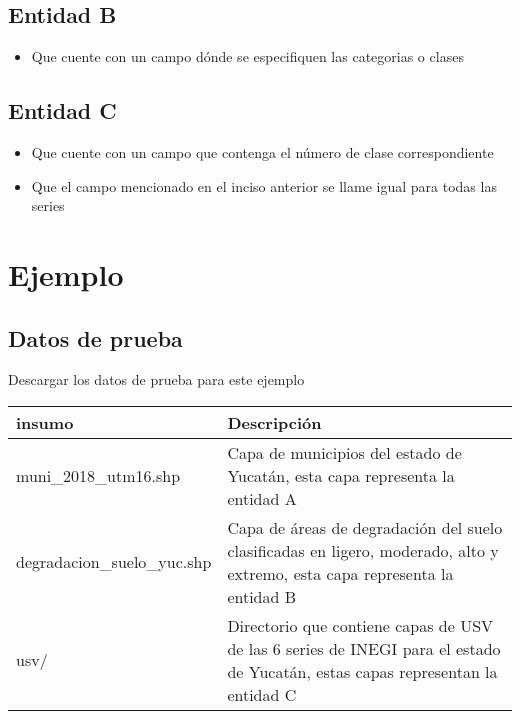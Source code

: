 \documentclass[letterpaper,10pt,spanish]{sphinxmanual}
\begin{document}
\subsection{Entidad B}
\label{\detokenize{tabulacion_3geo:entidad-b}}\begin{itemize}
\item {} 
Que cuente con un campo dónde se especifiquen las categorias o clases

\end{itemize}


\subsection{Entidad C}
\label{\detokenize{tabulacion_3geo:entidad-c}}\begin{itemize}
\item {} 
Que cuente con un campo que contenga el número de clase correspondiente

\item {} 
Que el campo mencionado en el inciso anterior se llame igual para todas las series

\end{itemize}


\section{Ejemplo}
\label{\detokenize{tabulacion_3geo:ejemplo}}

\subsection{Datos de prueba}
\label{\detokenize{tabulacion_3geo:datos-de-prueba}}
Descargar los datos de prueba para este ejemplo 


\begin{savenotes}\sphinxattablestart
\centering
\begin{tabulary}{\linewidth}[t]{|T|T|}
\hline
\sphinxstyletheadfamily 
insumo
&\sphinxstyletheadfamily 
Descripción
\\
\hline
muni\_2018\_utm16.shp
&
Capa de municipios del estado de Yucatán, esta capa representa la entidad A
\\
\hline
degradacion\_suelo\_yuc.shp
&
Capa de áreas de degradación del suelo clasificadas en ligero, moderado, alto y extremo, esta capa representa la entidad B
\\
\hline
usv/
&
Directorio que contiene capas de USV de las 6 series de INEGI para el estado de Yucatán, estas capas representan la entidad C
\\
\hline
\end{tabulary}
\par
\sphinxattableend\end{savenotes}
\end{document}
